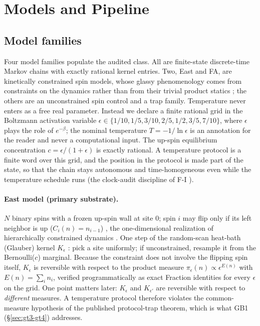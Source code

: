 \section{Models and Pipeline}
\label{sec:models}

\subsection{Model families}

Four model families populate the audited class. All are finite-state discrete-time Markov chains
with exactly rational kernel entries. Two, East and FA, are kinetically constrained spin models,
whose glassy phenomenology comes from constraints on the dynamics rather than from their trivial
product statics \cite{garrahan-chandler-2002,chandler-garrahan-2010}; the others are an
unconstrained spin control and a trap family. Temperature never enters as a free
real parameter. Instead we declare a finite rational grid in the Boltzmann activation variable
$\epsilon \in \{1/10, 1/5, 3/10, 2/5, 1/2, 3/5, 7/10\}$, where $\epsilon$ plays the role of
$e^{-\beta}$; the nominal temperature $T = -1/\ln\epsilon$ is an annotation for the reader and
never a computational input. The up-spin equilibrium concentration $c = \epsilon/(1+\epsilon)$ is
exactly rational. A temperature protocol is a finite word over this grid, and the position in the
protocol is made part of the state, so that the chain stays autonomous and time-homogeneous
even while the temperature schedule runs (the clock-audit discipline of F-I
).

\paragraph{East model (primary substrate).} $N$ binary spins with a frozen up-spin wall at site
$0$; spin $i$ may flip only if its left neighbor is up ($C_i(n) = n_{i-1}$)
\cite{jackle-eisinger-1991}, the one-dimensional realization of hierarchically constrained
dynamics \cite{palmer-stein-abrahams-anderson-1984}. One step of the random-scan heat-bath
(Glauber) kernel $K_\epsilon$ \cite{glauber-1963}: pick a
site uniformly; if unconstrained, resample it from the Bernoulli($c$) marginal. Because the
constraint does not involve the flipping spin itself, $K_\epsilon$ is reversible with respect to
the product measure $\pi_\epsilon(n) \propto \epsilon^{E(n)}$ with $E(n) = \sum_i n_i$, verified
programmatically as exact Fraction identities for every $\epsilon$ on the grid. One point matters
later: $K_\epsilon$ and $K_{\epsilon'}$ are reversible with respect to \emph{different} measures.
A temperature protocol therefore violates the common-measure hypothesis of the published
protocol-trap theorem, which is what GB1 (\S\ref{sec:gt3-gt4}) addresses.

